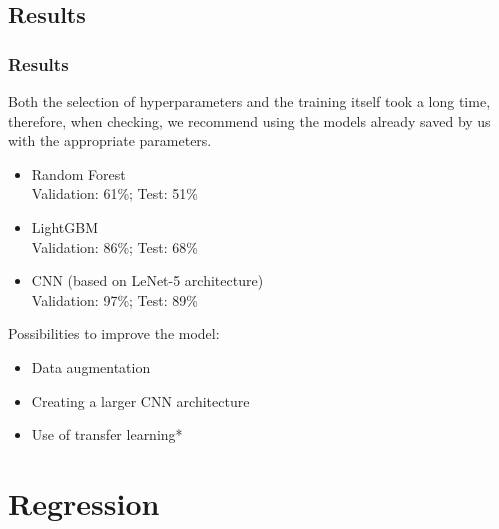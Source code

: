 \documentclass[8pt]{beamer}
\begin{document}
\subsection{Results}
\begin{frame}
\frametitle{Results}
Both the selection of hyperparameters and the training itself took a long time, therefore, when checking, we recommend using the models already saved by us with the appropriate parameters.\\
\vspace{2mm}
\begin{itemize}
    \item<1-> Random Forest\\
    Validation: 61\%; Test: 51\%\\
    \item<1-> LightGBM\\
    Validation: 86\%; Test: 68\%
    \item<1-> CNN (based on LeNet-5 architecture)\\
    Validation: 97\%; Test: 89\%
\end{itemize}
\vspace{2mm}
Possibilities to improve the model:
\begin{itemize}
    \item<1-> Data augmentation
    \item<1-> Creating a larger CNN architecture
    \item<1-> Use of transfer learning*
\end{itemize}

\end{frame}

\section{Regression}
\end{document}
